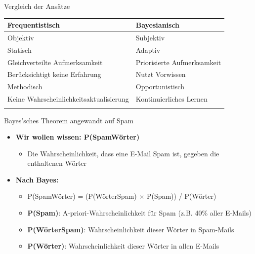 \documentclass[
  ignorenonframetext,
]{beamer}
\newcounter{none} %
\providecommand{\tightlist}{%
  \setlength{\itemsep}{0pt}\setlength{\parskip}{0pt}}
\begin{document}
\begin{frame}{Vergleich der Ansätze}
\protect{}\label{vergleich-der-ansuxe4tze}
{\def\LTcaptype{none} %
\begin{longtable}[]{@{}
  >{\raggedright\arraybackslash}p{}
  >{\raggedright\arraybackslash}p{}@{}}
\toprule\noalign{}
\begin{minipage}[b]{\linewidth}\raggedright
Frequentistisch
\end{minipage} & \begin{minipage}[b]{\linewidth}\raggedright
Bayesianisch
\end{minipage} \\
\midrule\noalign{}
\endhead
Objektiv & Subjektiv \\
Statisch & Adaptiv \\
Gleichverteilte Aufmerksamkeit & Priorisierte Aufmerksamkeit \\
Berücksichtigt keine Erfahrung & Nutzt Vorwissen \\
Methodisch & Opportunistisch \\
Keine Wahrscheinlichkeitsaktualisierung & Kontinuierliches Lernen \\
\bottomrule\noalign{}
\end{longtable}
}
\end{frame}

\begin{frame}{Bayes'sches Theorem angewandt auf Spam}
\protect{}\label{bayessches-theorem-angewandt-auf-spam}
\begin{itemize}
\tightlist
\item
  \textbf{Wir wollen wissen: P(Spam\textbar Wörter)}

  \begin{itemize}
  \tightlist
  \item
    Die Wahrscheinlichkeit, dass eine E-Mail Spam ist, gegeben die
    enthaltenen Wörter
  \end{itemize}
\item
  \textbf{Nach Bayes:}

  \begin{itemize}
  \tightlist
  \item
    P(Spam\textbar Wörter) = (P(Wörter\textbar Spam) × P(Spam)) /
    P(Wörter)
  \item
    \textbf{P(Spam)}: A-priori-Wahrscheinlichkeit für Spam (z.B. 40\%
    aller E-Mails)
  \item
    \textbf{P(Wörter\textbar Spam)}: Wahrscheinlichkeit dieser Wörter in
    Spam-Mails
  \item
    \textbf{P(Wörter)}: Wahrscheinlichkeit dieser Wörter in allen
    E-Mails
  \end{itemize}
\end{itemize}
\end{frame}
\end{document}
